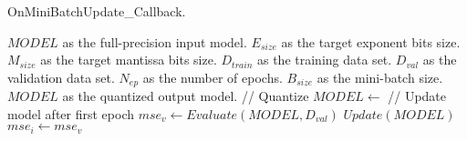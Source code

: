 \documentclass{article}
\begin{document}
\thispagestyle{empty} %

\setcounter{algorithm}{1}

\begin{algorithm}[h!]
    \caption{OnMiniBatchUpdate\_Callback.}
    \label{alg:quantization_integration}
    \begin{algorithmic}[1]
        \renewcommand{\algorithmicrequire}{\textbf{Input:}}
        \renewcommand{\algorithmicensure}{\textbf{Output:}}
        \Require $MODEL$ as the full-precision input model.
        \Require $E_{size}$ as the target exponent bits size.
        \Require $M_{size}$ as the target mantissa bits size.
        \Require $D_{train}$ as the training data set.
        \Require $D_{val}$ as the validation data set.
        \Require $N_{ep}$ as the number of epochs.
        \Require $B_{size}$ as the mini-batch size.
        \Ensure $MODEL$ as the quantized output model.
        \State // Quantize
        \State $MODEL \gets$  
            \State // Update model after first epoch
            \State $mse_v \gets Evaluate(MODEL, D_{val})$
                \State $Update(MODEL)$
                \State $mse_i \gets mse_v$
            \EndIf
        \EndIf
    \end{algorithmic}
\end{algorithm}
\end{document}
